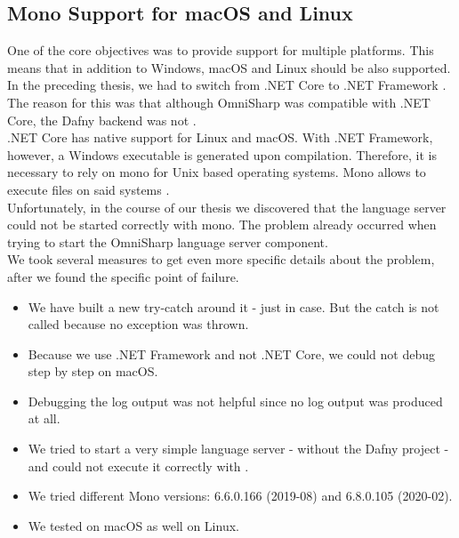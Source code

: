 

\subsection{Mono Support for macOS and Linux}
\label{section:implementation:mono}
One of the core objectives was to provide support for multiple platforms.
This means that in addition to Windows, macOS and Linux should be also supported. \\

In the preceding thesis, we had to switch from .NET Core to .NET Framework \cite{sa}.
The reason for this was that although OmniSharp was compatible with .NET Core,
the Dafny backend was not \cite{sa}.\\

.NET Core has native support for Linux and macOS. 
With .NET Framework, however, a Windows executable is generated upon compilation.
Therefore, it is necessary to rely on mono for Unix based operating systems.
Mono allows to execute  files on said systems \cite{mono}.  \\

Unfortunately, in the course of our thesis we discovered that the language server could not be started correctly with mono.
The problem already occurred when trying to start the OmniSharp language server component. \\

We took several measures to get even more specific details about the problem, after we found the specific point of failure.

\begin{itemize}
    \item We have built a new try-catch around it - just in case. But the catch is not called because no exception was thrown.
    \item Because we use .NET Framework and not .NET Core, we could not debug step by step on macOS.
    \item Debugging the log output was not helpful since no log output was produced at all.
    \item We tried to start a very simple language server - without the Dafny project - and could not execute it correctly with . 
    \item We tried different Mono versions: 6.6.0.166 (2019-08) and 6.8.0.105 (2020-02).
    \item We tested on macOS as well on Linux.
\end{itemize}

